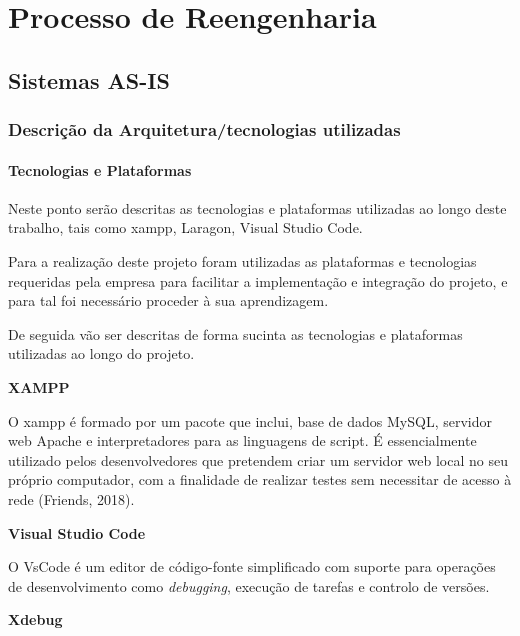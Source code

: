 
\chapter{Processo de Reengenharia}


\section{Sistemas AS-IS}
\subsection{Descrição da Arquitetura/tecnologias utilizadas}
\subsubsection{Tecnologias e Plataformas}
\par Neste ponto serão descritas as tecnologias e plataformas utilizadas ao longo deste trabalho, tais como \acrshort{xampp}, Laragon, Visual Studio Code.
\par Para a realização deste projeto foram utilizadas as plataformas e tecnologias requeridas pela empresa para facilitar a implementação e integração do projeto, e para tal foi necessário proceder à sua aprendizagem.
\par De seguida vão ser descritas de forma sucinta as tecnologias e plataformas utilizadas ao longo do projeto.\newline


\textbf{XAMPP}

O \acrshort{xampp} é formado por um pacote que inclui, base de dados MySQL, servidor web Apache e interpretadores para as linguagens de script. É essencialmente utilizado pelos desenvolvedores que pretendem criar um servidor web local no seu próprio computador, com a finalidade de realizar testes sem necessitar de acesso à rede (Friends, 2018).\newline


\textbf{Visual Studio Code}

O VsCode é um editor de código-fonte simplificado com suporte para operações de desenvolvimento como \textit{debugging}, execução de tarefas e controlo de versões.\newline %

\quad \textbf{Xdebug}

